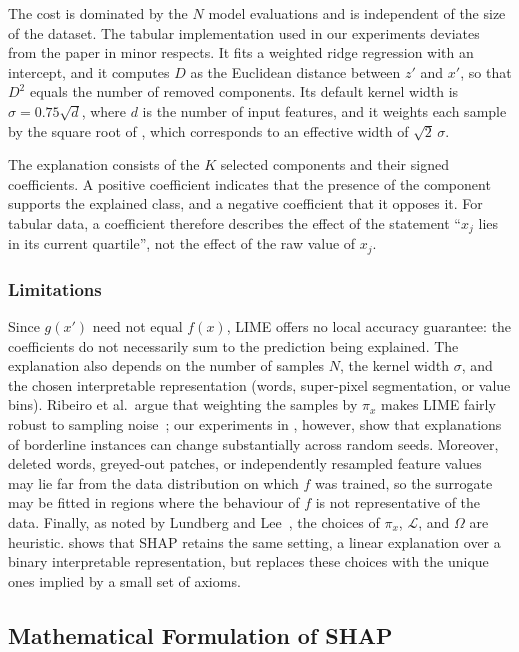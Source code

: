    The cost is dominated by the $N$ model evaluations and is independent of the size of the dataset. The tabular implementation used in our experiments deviates from the paper in minor respects. It fits a weighted ridge regression with an intercept, and it computes $D$ as the Euclidean distance between $z'$ and $x'$, so that $D^2$ equals the number of removed components. Its default kernel width is $\sigma = 0.75\sqrt{d}$, where $d$ is the number of input features, and it weights each sample by the square root of , which corresponds to an effective width of $\sqrt{2}\,\sigma$.

    The explanation consists of the $K$ selected components and their signed coefficients. A positive coefficient indicates that the presence of the component supports the explained class, and a negative coefficient that it opposes it. For tabular data, a coefficient therefore describes the effect of the statement ``$x_j$ lies in its current quartile'', not the effect of the raw value of $x_j$.

    \subsubsection{Limitations}
    Since $g(x')$ need not equal $f(x)$, LIME offers no local accuracy guarantee: the coefficients do not necessarily sum to the prediction being explained. The explanation also depends on the number of samples $N$, the kernel width $\sigma$, and the chosen interpretable representation (words, super-pixel segmentation, or value bins). Ribeiro et al.\ argue that weighting the samples by $\pi_x$ makes LIME fairly robust to sampling noise~\cite{ribeiro-etal-2016-trust}; our experiments in , however, show that explanations of borderline instances can change substantially across random seeds. Moreover, deleted words, greyed-out patches, or independently resampled feature values may lie far from the data distribution on which $f$ was trained, so the surrogate may be fitted in regions where the behaviour of $f$ is not representative of the data. Finally, as noted by Lundberg and Lee~\cite{NIPS2017_8a20a862}, the choices of $\pi_x$, $\mathcal{L}$, and $\Omega$ are heuristic.  shows that SHAP retains the same setting, a linear explanation over a binary interpretable representation, but replaces these choices with the unique ones implied by a small set of axioms.

    \subsection{Mathematical Formulation of SHAP}
    \label{sec:math-shap}

